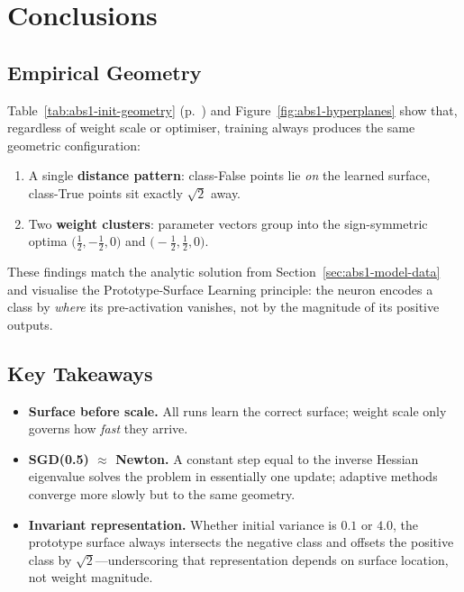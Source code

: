﻿%
\section{Conclusions}
\label{sec:abs1-conclusions}

\subsection*{Empirical Geometry}

Table~\ref{tab:abs1-init-geometry} (p.~\pageref{tab:abs1-init-geometry}) and
Figure~\ref{fig:abs1-hyperplanes} show that, regardless of weight scale or
optimiser, training always produces the same geometric configuration:

\begin{enumerate}[label=(\alph*)]
    \item A single \textbf{distance pattern}: class-False points lie \emph{on}
          the learned surface, class-True points sit exactly
          $\sqrt2$ away.
    \item Two \textbf{weight clusters}: parameter vectors group into the
          sign-symmetric optima
          \(\bigl(\tfrac12,-\tfrac12,0\bigr)\) and
          \(\bigl(-\tfrac12,\tfrac12,0\bigr)\).
\end{enumerate}

These findings match the analytic solution from
Section~\ref{sec:abs1-model-data} and visualise the Prototype-Surface Learning
principle: the neuron encodes a class by \emph{where} its pre-activation
vanishes, not by the magnitude of its positive outputs.

\subsection*{Key Takeaways}

\begin{itemize}
    \item \textbf{Surface before scale.}  
          All runs learn the correct surface; weight scale only governs how
          \emph{fast} they arrive.
    \item \textbf{SGD(0.5) $\boldsymbol{\approx}$ Newton.}  
          A constant step equal to the inverse Hessian eigenvalue solves the
          problem in essentially one update; adaptive methods converge more
          slowly but to the same geometry.
    \item \textbf{Invariant representation.}  
          Whether initial variance is $0.1$ or $4.0$, the prototype surface
          always intersects the negative class and offsets the positive class
          by $\sqrt2$—underscoring that representation depends on surface
          location, not weight magnitude.
\end{itemize}

